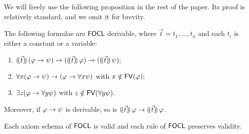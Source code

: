 \documentclass[sigconf,anonymous]{aamas}
\begin{document}


We will freely use the following proposition in the rest of the paper. Its proof is relatively standard, and we omit it for brevity. 

\begin{proposition}\label{prop.first}
    The following formulae are $\mathsf{FOCL}$ derivable, where $\vec{t}=t_1,\ldots,t_n$ and each $t_i$ is either a constant or a variable: 
    \begin{enumerate}
        \item $(\!( \vec{t} )\!)\,(\varphi\to \psi)\to ((\!( \vec{t} )\!)\,\varphi) \to ((\!( \vec{t} )\!)\,\psi); $
        \item $\forall x (\varphi \to \psi)\to (\varphi \to \forall x \psi)$ with $x\notin \mathsf{FV}(\varphi);$
        \item $\exists z (\varphi \to \forall y \psi )$ with $z\notin \mathsf{FV}(\forall y \psi).$
      \end{enumerate}
      Moreover, if $\varphi\to \psi$ is derivable, so is $(\!( \vec{t} )\!)\,\varphi \to (\!( \vec{t} )\!)\,\varphi $.
\end{proposition}


\begin{lemma}\label{lemma:sound}
    Each axiom schema of $\mathsf{FOCL}$ is valid and each rule of $\mathsf{FOCL}$ preserves validity.%
\end{lemma}
\end{document}
